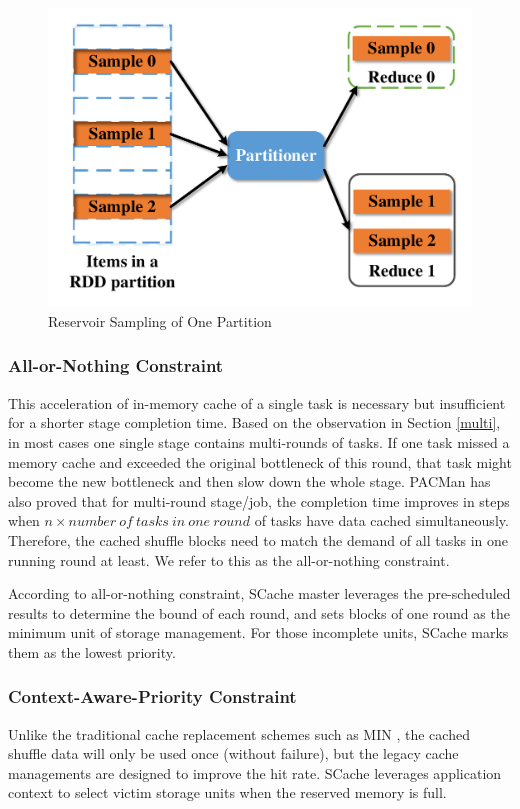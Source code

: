 \begin{figure}
	\centering
	\includegraphics[width=0.6\linewidth]{fig/sample}
	\caption{Reservoir Sampling of One Partition}
	\label{fig:sample}
	\vspace{-1em}
\end{figure}

\subsubsection{All-or-Nothing Constraint}
This acceleration of in-memory cache of a single task is necessary but insufficient for a shorter stage completion time. 
Based on the observation in Section \ref{multi}, in most cases one single stage contains multi-rounds of tasks. 
If one task missed a memory cache and exceeded the original bottleneck of this round, that task might become the new bottleneck and then slow down the whole stage. 
PACMan \cite{pacman} has also proved that for multi-round stage/job, the completion time improves in steps when $n\times number\ of\ tasks\ in\ one\ round$ of tasks have data cached simultaneously. 
Therefore, the cached shuffle blocks need to match the demand of all tasks in one running round at least. We refer to this as the all-or-nothing constraint.

According to all-or-nothing constraint, SCache master leverages the pre-scheduled results to determine the bound of each round, and sets blocks of one round as the minimum unit of storage management.
For those incomplete units, SCache marks them as the lowest priority.

\subsubsection{Context-Aware-Priority Constraint}
Unlike the traditional cache replacement schemes such as MIN \cite{min}, the cached shuffle data will only be used once (without failure), but the legacy cache managements are designed to improve the hit rate.
SCache leverages application context to select victim storage units when the reserved memory is full.

